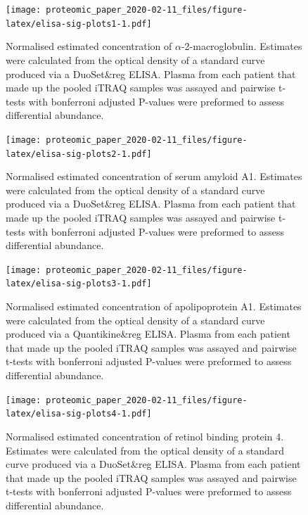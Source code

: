 \documentclass[
]{article}
\begin{document}
\clearpage



\begin{figure}
\centering
\texttt{[image: proteomic\_paper\_2020-02-11\_files/figure-latex/elisa-sig-plots1-1.pdf]}
\caption{\label{fig:elisa-sig-plots1}Normalised estimated concentration of \(\alpha\)-2-macroglobulin. Estimates were calculated from the optical density of a standard curve produced via a DuoSet\&reg ELISA. Plasma from each patient that made up the pooled iTRAQ samples was assayed and pairwise t-tests with bonferroni adjusted P-values were preformed to assess differential abundance.}
\end{figure}



\begin{figure}
\centering
\texttt{[image: proteomic\_paper\_2020-02-11\_files/figure-latex/elisa-sig-plots2-1.pdf]}
\caption{\label{fig:elisa-sig-plots2}Normalised estimated concentration of serum amyloid A1. Estimates were calculated from the optical density of a standard curve produced via a DuoSet\&reg ELISA. Plasma from each patient that made up the pooled iTRAQ samples was assayed and pairwise t-tests with bonferroni adjusted P-values were preformed to assess differential abundance.}
\end{figure}



\begin{figure}
\centering
\texttt{[image: proteomic\_paper\_2020-02-11\_files/figure-latex/elisa-sig-plots3-1.pdf]}
\caption{\label{fig:elisa-sig-plots3}Normalised estimated concentration of apolipoprotein A1. Estimates were calculated from the optical density of a standard curve produced via a Quantikine\&reg ELISA. Plasma from each patient that made up the pooled iTRAQ samples was assayed and pairwise t-tests with bonferroni adjusted P-values were preformed to assess differential abundance.}
\end{figure}



\begin{figure}
\centering
\texttt{[image: proteomic\_paper\_2020-02-11\_files/figure-latex/elisa-sig-plots4-1.pdf]}
\caption{\label{fig:elisa-sig-plots4}Normalised estimated concentration of retinol binding protein 4. Estimates were calculated from the optical density of a standard curve produced via a DuoSet\&reg ELISA. Plasma from each patient that made up the pooled iTRAQ samples was assayed and pairwise t-tests with bonferroni adjusted P-values were preformed to assess differential abundance.}
\end{figure}
\end{document}
